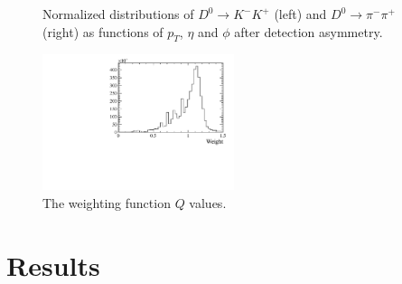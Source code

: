 \documentclass{article}
\begin{document}
        \begin{figure}[h!]
                \centering
                \caption{Normalized distributions of $D^0\to K^-K^+$ (left) and $D^0\to \pi^-\pi^+$ (right) as functions of $p_T$, $\eta$ and $\phi$ after detection asymmetry.}
        \end{figure}

        \begin{figure}[h!]
                \centering
                \includegraphics[width = 0.5\textwidth]{../work/RapidSimAnalysis/WeightingFunction/Plots/Weights.pdf}
                \caption{The weighting function $Q$ values.}
        \end{figure}

        

        \section{Results}


        \pagebreak
        \nocite{*}
        \printbibliography[notcategory=cited]
\end{document}
